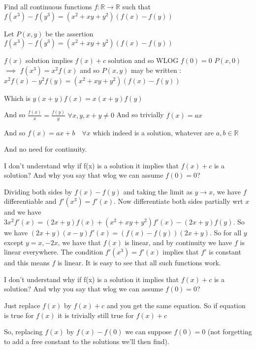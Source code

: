 \begin{solution}
	\begin{tcolorbox}Find all continuous functions $f: \mathbb{R}\to\mathbb{R}$ such that $f(x^3)-f(y^3)=(x^2+xy+y^2)(f(x)-f(y))$\end{tcolorbox}
Let $P(x,y)$ be the assertion $f(x^3)-f(y^3)=(x^2+xy+y^2)(f(x)-f(y))$

$f(x)$ solution implies $f(x)+c$ solution and so WLOG $f(0)=0$
$P(x,0)$ $\implies$ $f(x^3)=x^2f(x)$ and so $P(x,y)$ may be written :
$x^2f(x)-y^2f(y)=(x^2+xy+y^2)(f(x)-f(y))$

Which is $y(x+y)f(x)=x(x+y)f(y)$

And so $\frac{f(x)}x=\frac{f(y)}y$ $\forall x,y,x+y\ne 0$
And so trivially $f(x)=ax$

And so $\boxed{f(x)=ax+b\quad\forall x}$ which indeed is a solution, whatever are $a,b\in\mathbb R$

And no need for continuity.


\end{solution}



\begin{solution}
	I don't understand why if f(x) is a solution it implies that $f(x)+c$ is a solution?
And why you say that wlog we can assume $f(0)=0$?
\end{solution}



\begin{solution}
	Dividing both sides by $f(x)-f(y)$ and taking the limit as $y\to x$, we have $f$ differentiable and $f'(x^3)=f'(x)$. Now differentiate both sides partially wrt $x$ and we have $3x^2 f'(x) = (2x+y)f(x) + (x^2+xy+y^2)f'(x) - (2x+y)f(y)$. So we have $(2x+y)(x-y)f'(x) = (f(x)-f(y))(2x+y)$. So for all $y$ except $y=x,-2x$, we have that $f(x)$ is linear, and by continuity we have $f$ is linear everywhere. The condition $f'(x^3)= f'(x)$ implies that $f'$ is constant and this means $f$ is linear. It is easy to see that all such functions work.
\end{solution}



\begin{solution}
	\begin{tcolorbox}I don't understand why if f(x) is a solution it implies that $f(x)+c$ is a solution?
And why you say that wlog we can assume $f(0)=0$?\end{tcolorbox}
Just replace $f(x)$ by $f(x)+c$ and you get the same equation. So if equation is true for $f(x)$ it is trivially still true for $f(x)+c$

So, replacing $f(x)$ by $f(x)-f(0)$ we can suppose $f(0)=0$ (not forgetting to add a free constant to the solutions we'll then find).

\end{solution}



